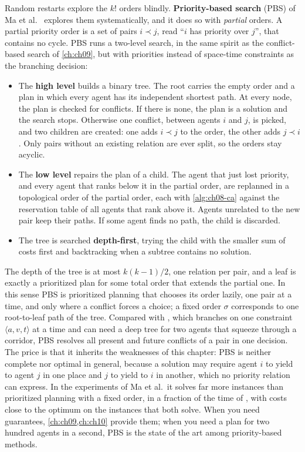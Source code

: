 Random restarts explore the $k!$ orders blindly. \textbf{Priority-based
search} (PBS) of Ma et al.~\cite{ma2019searching}
explores them systematically, and it does so with \emph{partial} orders. A partial
priority order is a set of pairs $i \prec j$, read ``$i$ has priority over $j$'', that
contains no cycle. PBS runs a two-level search, in the same spirit as the
conflict-based search of \cref{ch:ch09}, but with priorities instead of space-time
constraints as the branching decision:
\begin{itemize}
  \item The \textbf{high level} builds a binary tree. The root carries the empty order
        and a plan in which every agent has its independent shortest path. At every
        node, the plan is checked for conflicts. If there is none, the plan is a
        solution and the search stops. Otherwise one conflict, between agents $i$ and
        $j$, is picked, and two children are created: one adds $i \prec j$ to the
        order, the other adds $j \prec i$. Only pairs without an existing relation are
        ever split, so the orders stay acyclic.
  \item The \textbf{low level} repairs the plan of a child. The agent that just lost
        priority, and every agent that ranks below it in the partial order, are
        replanned in a topological order of the partial order, each with
        \cref{alg:ch08-ca} against the reservation table of all agents that rank above
        it. Agents unrelated to the new pair keep their paths. If some agent finds no
        path, the child is discarded.
  \item The tree is searched \textbf{depth-first}, trying the child with the smaller sum
        of costs first and backtracking when a subtree contains no solution.
\end{itemize}
The depth of the tree is at most $k(k-1)/2$, one relation per pair, and a leaf is
exactly a prioritized plan for some total order that extends the partial one. In this
sense PBS is prioritized planning that chooses its order lazily, one pair at a time,
and only where a conflict forces a choice; a fixed order $\sigma$ corresponds to one
root-to-leaf path of the tree. Compared with \cbs, which branches on one constraint
$\langle a, v, t \rangle$ at a time and can need a deep tree for two agents that
squeeze through a corridor, PBS resolves all present and future conflicts of a pair in
one decision. The price is that it inherits the weaknesses of this chapter: PBS is
neither complete nor optimal in general, because a solution may require agent $i$ to
yield to agent $j$ in one place and $j$ to yield to $i$ in another, which no priority
relation can express. In the experiments of Ma et al.\ it solves far more instances
than prioritized planning with a fixed order, in a fraction of the time of \cbs, with
costs close to the optimum on the instances that both solve. When you need
guarantees, \cref{ch:ch09,ch:ch10} provide them; when you need a plan for two hundred
agents in a second, PBS is the state of the art among priority-based methods.

